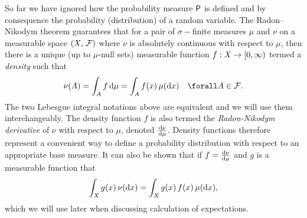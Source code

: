So far we have ignored how the probability measure $\mathsf{P}$ is defined and by consequence the probability (distribution) of a random variable. 
The Radon--Nikodym theorem guarantees that for a pair of $\sigma-$finite measures $\mu$ and $\nu$ on a measurable space $(\mathit{X},\,\mathcal{F})$ where $\nu$ is absolutely continuous with respect to $\mu$,  then there is a unique (up to $\mu$-null sets) measurable function $f : \mathit{X} \to [0,\infty)$ termed a \emph{density} such that
\begin{equation}\label{eq:radon-nikodym}
  \nu(\set{A}) = \int_{\set{A}} f\,\dr\mu 
  = \int_{\set{A}} f(x) \, \mu(\dr x)
  \quad \forall \set{A} \in \sset{F}.
\end{equation}
The two Lebesgue integral notations above are equivalent and we will use them interchangeably. The density function $f$ is also termed the \emph{Radon-Nikodym derivative} of $\nu$ with respect to $\mu$, denoted $\frac{\mathrm{d} \nu}{\mathrm{d} \mu}$. Density functions therefore represent a convenient way to define a probability distribution with respect to an appropriate base measure. %
It can also be shown that if $f = \frac{\mathrm{d} \nu}{\mathrm{d} \mu}$ and  $g$ is a 	 measurable function that
\begin{equation}\label{eq:integral-wrt-density}
  \int_{\mathit{X}} g(x)\,\nu(\mathrm{d} x) = \int_{\mathit{X}} g(x)\, f(x)\,\mu(\mathrm{d} x),
\end{equation}
which we will use later when discussing calculation of expectations.

